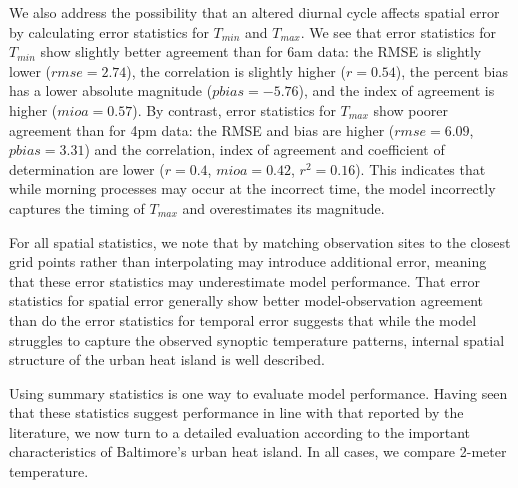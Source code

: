 \documentclass[draft,linenumbers]{agujournal}
\begin{document}
We also address the possibility that an altered diurnal cycle affects spatial error by calculating error statistics for $T_{min}$ and $T_{max}$. We see that error statistics for $T_{min}$ show slightly better agreement than for 6am data: the RMSE is slightly lower ($rmse = 2.74$), the correlation is slightly higher ($r=0.54$), the percent bias has a lower absolute magnitude ($pbias=-5.76$), and the index of agreement is higher ($mioa=0.57$). By contrast, error statistics for $T_{max}$ show poorer agreement than for 4pm data: 
the RMSE and bias are higher ($rmse=6.09$, $pbias=3.31$) and the correlation, index of agreement and coefficient of determination are lower ($r=0.4$, $mioa=0.42$, $r^2=0.16$). 
This indicates that while morning processes may occur at the incorrect time, the model incorrectly captures the timing of $T_{max}$ and overestimates its magnitude. 

For all spatial statistics, we note that by matching observation sites to the closest grid points rather than interpolating may introduce additional error, meaning that these error statistics may underestimate model performance. That error statistics for spatial error generally show better model-observation agreement than do the error statistics for temporal error suggests that while the model struggles to capture the observed synoptic temperature patterns, internal spatial structure of the urban heat island is well described. 

Using summary statistics is one way to evaluate model performance. Having seen that these statistics suggest performance in line with that reported by the literature, we now turn to a detailed evaluation according to the important characteristics of Baltimore's urban heat island. In all cases, we compare 2-meter temperature.
\end{document}
